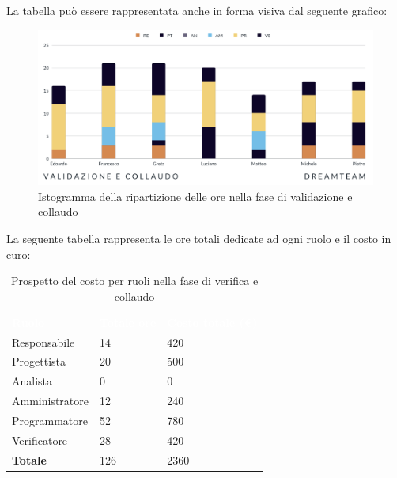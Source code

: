 La tabella può essere rappresentata anche in forma visiva dal seguente grafico:
\begin{figure}[H]
\centering
\includegraphics[scale=0.65]{Sezioni/SezioniPreventivo/grafici/Validazione_collaudo.png}
\caption{Istogramma della ripartizione delle ore  nella fase di validazione e collaudo}
\end{figure}

La seguente tabella rappresenta le ore totali dedicate ad ogni ruolo e il costo in euro:

\begin{table}[H]
\begin{center}
\renewcommand{\arraystretch}{1.5}
\begin{tabular}{ m{}<{\centering}  m{}<{\centering} m{}<{\centering}}
	\rowcolor{darkblue}
	\textcolor{white}{\textbf{Ruolo}}&\textcolor{white}{\textbf{Totale ore}}&\textcolor{white}{\textbf{Costo totale (\euro)}}\\ 

	Responsabile  & 14 & 420 \\	
	
	Progettista & 20 & 500 \\
	
	Analista & 0 & 0 \\

	Amministratore & 12 & 240 \\
	
	Programmatore & 52 & 780 \\
	
	Verificatore & 28 & 420 \\
	
	\textbf{Totale} & 126 & 2360 \\
	
\end{tabular}
\caption{Prospetto del costo per ruoli nella fase di verifica e collaudo}
\end{center}
\end{table}

